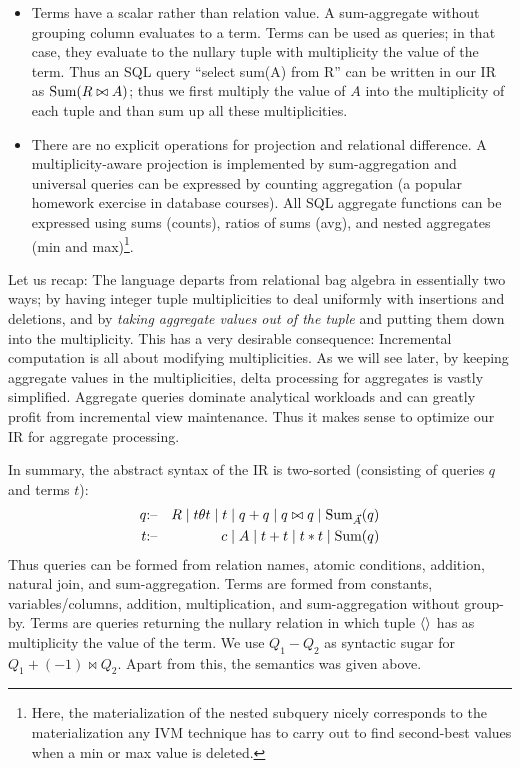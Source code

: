 \begin{itemize}
\item
Terms have a scalar rather than relation value. A sum-aggregate without grouping column evaluates to a term.
%
Terms can be used as queries; in that case, they evaluate to the nullary tuple with multiplicity the value of the term.
Thus an SQL query ``select sum(A) from R'' can be written in our IR as $\mbox{Sum}(R \bowtie A)$; thus we first multiply the value of $A$ into the multiplicity of each tuple and than sum up all these multiplicities.

\item
There are no explicit operations for projection and relational difference. A multiplicity-aware projection is implemented by
sum-aggregation and universal queries can be expressed by counting aggregation (a popular homework exercise in database courses). All SQL aggregate functions can be expressed using sums (counts), ratios of sums (avg),
and nested aggregates (min and max)\footnote{Here, the materialization of the nested subquery
nicely corresponds to the materialization any IVM technique has to carry out to find second-best values when a min or max value is deleted.}.
\end{itemize}

Let us recap: The language departs from relational bag algebra in essentially two ways; by having integer tuple multiplicities
to deal uniformly with insertions and deletions, and by {\em taking aggregate values out of the tuple} and putting them down into
the multiplicity. This has a very desirable consequence: Incremental computation is all about modifying multiplicities.
As we will see later, by keeping aggregate values in the multiplicities, delta processing for aggregates is vastly simplified.
Aggregate queries dominate analytical workloads and can greatly profit from incremental view maintenance. Thus it makes sense to optimize our IR for aggregate processing.




In summary, the abstract syntax of the IR is two-sorted (consisting of queries $q$ and terms $t$):
%
\begin{eqnarray*}
q &\mbox{:--}& R \mid t \theta t \mid t \mid q + q \mid q \bowtie q \mid \mbox{Sum}_{\vec{A}}(q) \\
t &\mbox{:--}& c \mid A                 \mid t + t \mid t * t       \mid \mbox{Sum}(q)
\end{eqnarray*}
Thus queries can be formed from relation names, atomic conditions, addition, natural join, and sum-aggregation.
Terms are formed from constants, variables/columns, addition, multiplication, and sum-aggregation without group-by.
Terms are queries returning the nullary relation in which
tuple ${\langle\rangle}$ has as multiplicity the value of the term. We use $Q_1 - Q_2$ as syntactic sugar for $Q_1 + (-1)\bowtie Q_2$.
Apart from this, the semantics was given above.


